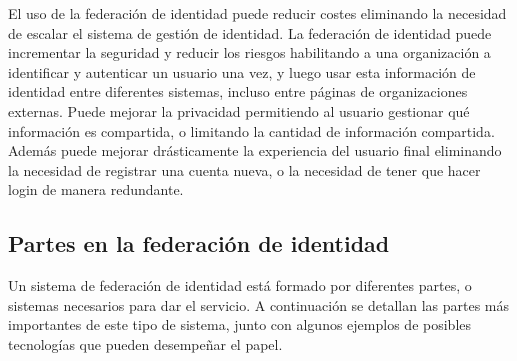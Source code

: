     El uso de la federación de identidad puede reducir costes
    eliminando la necesidad de escalar el sistema de gestión de
    identidad. La federación de identidad puede incrementar la
    seguridad y reducir los riesgos habilitando a una organización a
    identificar y autenticar un usuario una vez, y luego usar esta
    información de identidad entre diferentes sistemas, incluso entre
    páginas de organizaciones externas. Puede mejorar la privacidad
    permitiendo al usuario gestionar qué información es compartida, o
    limitando la cantidad de información compartida. Además puede
    mejorar drásticamente la experiencia del usuario final eliminando
    la necesidad de registrar una cuenta nueva, o la necesidad de
    tener que hacer login de manera redundante.

        \subsection{Partes en la federación de identidad}

    Un sistema de federación de identidad está formado por diferentes
    partes, o sistemas necesarios para dar el servicio. A continuación
    se detallan las partes más importantes de este tipo de sistema,
    junto con algunos ejemplos de posibles tecnologías que pueden
    desempeñar el papel.

